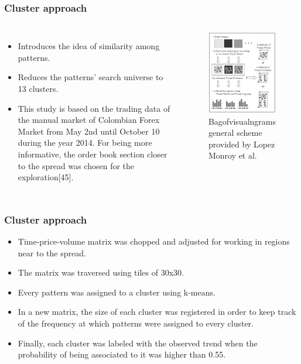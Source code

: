 \documentclass{beamer}
\begin{document}
\begin{frame}
\frametitle{Cluster approach}
\begin{columns}
\begin{itemize}
	\item Introduces the idea of similarity among patterns.
	\item Reduces the patterns' search universe to 13 clusters.
	\item This study is based on the trading data of the manual market of Colombian Forex Market from May 2nd until October 10 during the year 2014. For being more informative, the order book section closer to the spread was chosen for the exploration[45].
\end{itemize}
\begin{figure}[]
	\centering
		\includegraphics[scale=0.5]{bagOfWords.png}
	\caption{\footnotesize Bag\-of\-visual\-ngrams general scheme provided by Lopez Monroy et al. \cite{draw}}
	\label{fig:bagOfWords}
\end{figure}
\end{columns}
\end{frame}

\begin{frame}
\frametitle{Cluster approach}

\begin{itemize}
	\item Time-price-volume matrix was chopped and adjusted for working in regions near to the spread.
	\item The matrix was traversed using tiles of 30x30.
	\item Every pattern was assigned to a cluster using k-means.
	\item In a new matrix, the size of each cluster was registered in order to keep track of the frequency at which patterns were assigned to every cluster.
	\item Finally, each cluster was labeled with the observed trend when the probability of being associated to it was higher than 0.55.
\end{itemize}


\end{frame}
\end{document}
